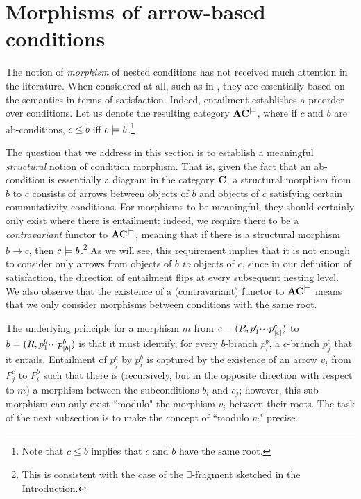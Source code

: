 \section{Morphisms of arrow-based conditions}

The notion of \emph{morphism} of nested conditions has not received much attention in the literature. When considered at all, such as in \cite{bchk:conditional-reactive-systems,sksclo:coinductive-techniques-for-satisfiability}, they are essentially based on the semantics in terms of satisfaction. Indeed, entailment establishes a preorder over conditions. Let us denote the resulting category $\mathbf{AC}^{\models}$, where if $c$ and $b$ are ab-conditions, $c \leq b$ iff $c \models b$.\footnote{Note that $c \leq b$ implies that $c$ and $b$ have the same root.} 

The question that we address in this section is to establish a meaningful \emph{structural} notion of condition morphism. That is, given the fact that an ab-condition is essentially a diagram in the category $\mathbf{C}$, a structural morphism from $b$ to $c$ consists of arrows between objects of $b$ and objects of $c$ satisfying certain commutativity conditions. For morphisms to be meaningful,  they should certainly only exist where there is entailment: indeed, we require there to be a \emph{contravariant} functor to $\mathbf{AC}^{\models}$, meaning that if there is a structural morphism $b \to c$, then $c \models b$.\footnote{This is consistent with the case of the $\exists$-fragment sketched in the Introduction.} As we will see, this requirement implies that it is not enough to consider only arrows from objects of $b$ \emph{to} objects of $c$, since in our definition of satisfaction, the direction of entailment flips at every subsequent nesting level. We also observe that the existence of a (contravariant) functor to $\mathbf{AC}^{\models}$ means that we only consider morphisms between conditions with the same root.

The underlying principle for a morphism $m$ from $c=(R,p^c_1{\cdotp\mkern-2mu\cdotp\mkern-2mu\cdotp\mkern1mu} p^c_{|c|})$  to $b=(R,p^b_1{\cdotp\mkern-2mu\cdotp\mkern-2mu\cdotp\mkern1mu} p^b_{|b|})$  is that it must identify, for every $b$-branch $p^b_i$, a $c$-branch $p^c_j$ that it entails. Entailment of $p^c_j$ by $p^b_i$ is captured by the existence of an arrow $v_i$ from $P^c_j$ to $P^b_i$  such that there is (recursively, but in the opposite direction with respect to $m$) a morphism between the subconditions $b_i$ and $c_j$; however, this sub-morphism can only exist ``modulo" the morphism $v_i$ between their roots. The task of the next subsection is to make the concept of ``modulo $v_i$" precise.

